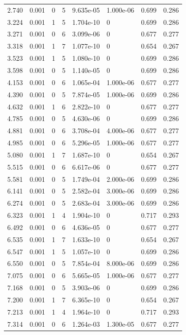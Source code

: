 \documentclass[preview]{standalone}
\begin{document}
{{\begin{tabular}{L{1.2cm}C{1.2cm} C{0.3cm}C{0.5cm} C{1.4cm}C{1.4cm} C{1.4cm}C{1.4cm}}
  2.740  &  0.001  & 0     &  5 &  9.635e-05  & 1.000e-06  & 0.699 &  0.286   \\ 
  3.224  &  0.001  & 1     &  5 &  1.704e-10  & 0  & 0.699 &  0.286   \\ 
  3.271  &  0.001  & 0     &  6 &  3.099e-06  & 0  & 0.677 &  0.277   \\ 
  3.318  &  0.001  & 1     &  7 &  1.077e-10  & 0  & 0.654 &  0.267   \\ 
  3.523  &  0.001  & 1     &  5 &  1.080e-10  & 0  & 0.699 &  0.286   \\ 
  3.598  &  0.001  & 0     &  5 &  1.140e-05  & 0  & 0.699 &  0.286   \\ 
  4.153  &  0.001  & 0     &  6 &  1.065e-04  & 1.000e-06  & 0.677 &  0.277   \\ 
  4.390  &  0.001  & 0     &  5 &  7.874e-05  & 1.000e-06  & 0.699 &  0.286   \\ 
  4.632  &  0.001  & 1     &  6 &  2.822e-10  & 0  & 0.677 &  0.277   \\ 
  4.785  &  0.001  & 0     &  5 &  4.630e-06  & 0  & 0.699 &  0.286   \\ 
  4.881  &  0.001  & 0     &  6 &  3.708e-04  & 4.000e-06  & 0.677 &  0.277   \\ 
  4.985  &  0.001  & 0     &  6 &  5.296e-05  & 1.000e-06  & 0.677 &  0.277   \\ 
  5.080  &  0.001  & 1     &  7 &  1.687e-10  & 0  & 0.654 &  0.267   \\ 
  5.515  &  0.001  & 0     &  6 &  6.617e-06  & 0  & 0.677 &  0.277   \\ 
  5.581  &  0.001  & 0     &  5 &  1.749e-04  & 2.000e-06  & 0.699 &  0.286   \\ 
  6.141  &  0.001  & 0     &  5 &  2.582e-04  & 3.000e-06  & 0.699 &  0.286   \\ 
  6.274  &  0.001  & 0     &  5 &  2.683e-04  & 3.000e-06  & 0.699 &  0.286   \\ 
  6.323  &  0.001  & 1     &  4 &  1.904e-10  & 0  & 0.717 &  0.293   \\ 
  6.492  &  0.001  & 0     &  6 &  4.636e-05  & 0  & 0.677 &  0.277   \\ 
  6.535  &  0.001  & 1     &  7 &  1.633e-10  & 0  & 0.654 &  0.267   \\ 
  6.547  &  0.001  & 1     &  5 &  1.057e-10  & 0  & 0.699 &  0.286   \\ 
  6.550  &  0.001  & 0     &  5 &  7.854e-04  & 8.000e-06  & 0.699 &  0.286   \\ 
  7.075  &  0.001  & 0     &  6 &  5.665e-05  & 1.000e-06  & 0.677 &  0.277   \\ 
  7.168  &  0.001  & 0     &  5 &  3.903e-06  & 0  & 0.699 &  0.286   \\ 
  7.200  &  0.001  & 1     &  7 &  6.365e-10  & 0  & 0.654 &  0.267   \\ 
  7.213  &  0.001  & 1     &  4 &  1.964e-10  & 0  & 0.717 &  0.293   \\ 
  7.314  &  0.001  & 0     &  6 &  1.264e-03  & 1.300e-05  & 0.677 &  0.277   \\ 
\hline 
\end{tabular} 

}}
\end{document}
